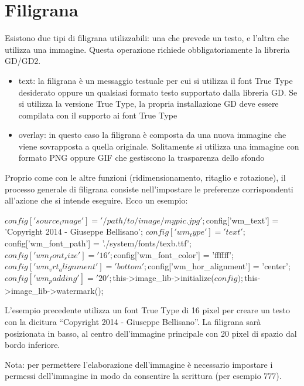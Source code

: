 \section*{Filigrana}
Esistono due tipi di filigrana utilizzabili: una che prevede un testo, e l'altra che utilizza una immagine. Questa operazione richiede obbligatoriamente la libreria GD/GD2.

\begin{itemize}
\item text: la filigrana è un messaggio testuale per cui si utilizza il font True Type desiderato oppure un qualsiasi formato testo supportato dalla libreria GD. Se si utilizza la versione True Type, la propria installazione GD deve essere compilata con il supporto ai font True Type
\item overlay: in questo caso la filigrana è composta da una nuova immagine che viene sovrapposta a quella originale. Solitamente si utilizza una immagine con formato PNG oppure GIF che gestiscono la trasparenza dello sfondo
\end{itemize}

Proprio come con le altre funzioni (ridimensionamento, ritaglio e rotazione), il processo generale di filigrana consiste nell'impostare le preferenze corrispondenti all'azione che si intende eseguire. Ecco un esempio:

\begin{code}
$config['source_image']	= '/path/to/image/mypic.jpg';
$config['wm_text'] = 'Copyright 2014 - Giuseppe Bellisano';
$config['wm_type'] = 'text';
$config['wm_font_path'] = './system/fonts/texb.ttf';
$config['wm_font_size']	= '16';
$config['wm_font_color'] = 'ffffff';
$config['wm_vrt_alignment'] = 'bottom';
$config['wm_hor_alignment'] = 'center';
$config['wm_padding'] = '20';

$this->image_lib->initialize($config); 

$this->image_lib->watermark();
\end{code}

L'esempio precedente utilizza un font True Type di 16 pixel per creare un testo con la dicitura ``Copyright 2014 - Giuseppe Bellisano''. La filigrana sarà posizionata in basso, al centro dell'immagine principale con 20 pixel di spazio dal bordo inferiore.

Nota: per permettere l'elaborazione dell'immagine è necessario impostare i permessi dell'immagine in modo da consentire la scrittura (per esempio 777).

